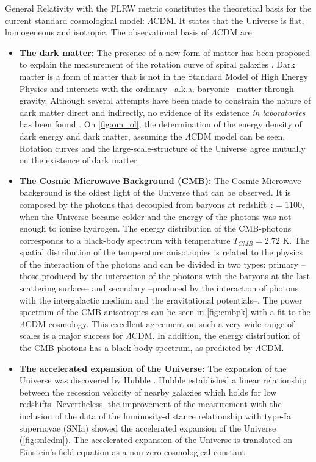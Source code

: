 General Relativity with the FLRW metric constitutes the theoretical basis for the current standard cosmological model: $\Lambda$CDM. It states that the Universe is flat, homogeneous and isotropic. The observational basis of $\Lambda$CDM are:
\begin{itemize}
\item {\bf The dark matter:} The presence of a new form of matter has been proposed to explain the measurement of the rotation curve of spiral galaxies \cite{1982ApJ...253...70B,1983Sci...220.1339R,1985ApJ...297..423B,1985ApJ...289...81R}. Dark matter is a form of matter that is not in the Standard Model of High Energy Physics and interacts with the ordinary --a.k.a. baryonic-- matter through gravity. Although several attempts have been made to constrain the nature of dark matter direct and indirectly, no evidence of its existence {\it in laboratories} has been found  \cite{2016JPhG...43a3001M,2016ConPh..57..496G}. On \autoref{fig:om_ol}, the determination of the energy density of dark energy and dark matter, assuming the $\Lambda$CDM model can be seen. Rotation curves and the large-scale-structure of the Universe agree mutually on the existence of dark matter.

\item {\bf The Cosmic Microwave Background (CMB):} The Cosmic Microwave background is the oldest light of the Universe that can be observed. It is composed by the photons that decoupled from baryons at redshift $z=1100$, when the Universe became colder and the energy of the photons was not enough to ionize hydrogen. The energy distribution of the CMB-photons corresponds to a black-body spectrum with temperature $T_{CMB}=2.72$ K. The spatial distribution of the temperature anisotropies is related to the physics of the interaction of the photons and can be divided in two types: primary --those produced by the interaction of the photons with the baryons at the last scattering surface-- and secondary --produced by the interaction of photons with the intergalactic medium and the gravitational potentials--. The power spectrum of the CMB anisotropies can be seen in \autoref{fig:cmbpk} with a fit to the $\Lambda$CDM cosmology. This excellent agreement on such a very wide range of scales is a major success for $\Lambda$CDM. In addition, the energy distribution of the CMB photons has a black-body spectrum, as predicted by $\Lambda$CDM.

\item {\bf The accelerated expansion of the Universe:} The expansion of the Universe was discovered by Hubble \cite{1929PNAS...15..168H}. Hubble established a linear relationship between the recession velocity of nearby galaxies which holds for low redshifts. Nevertheless, the improvement of the measurement with the inclusion of the data of the luminosity-distance relationship with type-Ia supernovae (SNIa) showed the accelerated expansion of the Universe \cite{1999ApJ...517..565P} (\autoref{fig:snlcdm}). The accelerated expansion of the Universe is translated on Einstein's field equation as a non-zero cosmological constant.


\end{itemize}

